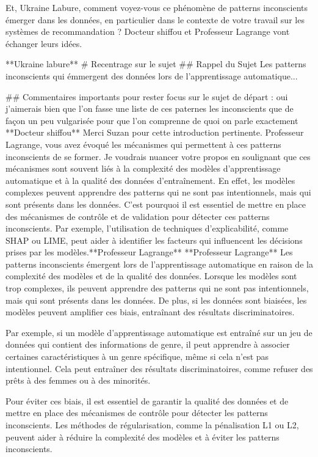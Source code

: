 Et, Ukraine Labure, comment voyez-vous ce phénomène de patterns inconscients émerger dans les données, en particulier dans le contexte de votre travail sur les systèmes de recommandation ?
Docteur shiffou et Professeur Lagrange vont échanger leurs idées.

                         **Ukraine labure**
                         # Recentrage sur le sujet
                         ## Rappel du Sujet
                         Les patterns inconscients qui émmergent des données lors de l'apprentissage automatique...

                         ## Commentaires importants pour rester focus sur le sujet de départ :
                         oui j'aimerais bien que l'on fasse une liste de ces paternes les inconscients que de façon un peu vulgarisée pour que l'on comprenne de quoi on parle exactement
                         **Docteur shiffou**
Merci Suzan pour cette introduction pertinente. Professeur Lagrange, vous avez évoqué les mécanismes qui permettent à ces patterns inconscients de se former. Je voudrais nuancer votre propos en soulignant que ces mécanismes sont souvent liés à la complexité des modèles d'apprentissage automatique et à la qualité des données d'entraînement. En effet, les modèles complexes peuvent apprendre des patterns qui ne sont pas intentionnels, mais qui sont présents dans les données. C'est pourquoi il est essentiel de mettre en place des mécanismes de contrôle et de validation pour détecter ces patterns inconscients. Par exemple, l'utilisation de techniques d'explicabilité, comme SHAP ou LIME, peut aider à identifier les facteurs qui influencent les décisions prises par les modèles.**Professeur Lagrange**
**Professeur Lagrange**
Les patterns inconscients émergent lors de l'apprentissage automatique en raison de la complexité des modèles et de la qualité des données. Lorsque les modèles sont trop complexes, ils peuvent apprendre des patterns qui ne sont pas intentionnels, mais qui sont présents dans les données. De plus, si les données sont biaisées, les modèles peuvent amplifier ces biais, entraînant des résultats discriminatoires.

Par exemple, si un modèle d'apprentissage automatique est entraîné sur un jeu de données qui contient des informations de genre, il peut apprendre à associer certaines caractéristiques à un genre spécifique, même si cela n'est pas intentionnel. Cela peut entraîner des résultats discriminatoires, comme refuser des prêts à des femmes ou à des minorités.

Pour éviter ces biais, il est essentiel de garantir la qualité des données et de mettre en place des mécanismes de contrôle pour détecter les patterns inconscients. Les méthodes de régularisation, comme la pénalisation L1 ou L2, peuvent aider à réduire la complexité des modèles et à éviter les patterns inconscients.

